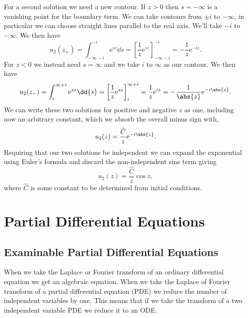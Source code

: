 \documentclass[fleqn]{NotesClass}
\newcommand*{\e}{\mathrm{e}}
\begin{document}
    For a second solution we need a new contour.
    If \(z > 0\) then \(s = -\infty\) is a vanishing point for the boundary term.
    We can take contours from \(\pm i\) to \(-\infty\), in particular we can choose straight lines parallel to the real axis.
    We'll take \(-i\) to \(-\infty\).
    We then have
    \begin{equation}
        u_2(z_+) = \int_{-\infty - i}^{-i} \e^{sz} \dd{s} = \left[ \frac{1}{z}\e^{sz} \right]_{-\infty - i}^{-i} = -\frac{1}{z}\e^{-iz}.
    \end{equation}
    For \(z < 0\) we instead need \(s = \infty\) and we take \(i\) to \(\infty\) as our contour.
    We then have
    \begin{equation}
        u_2(z_-) = \int_{i}^{\infty + i} \e^{sz} \dd{s} = \left[ \frac{1}{z}\e^{sz} \right]_{i}^{\infty + i} = \frac{1}{z}\e^{iz} = -\frac{1}{\abs{z}}\e^{-i\abs{z}}.
    \end{equation}
    We can write these two solutions for positive and negative \(z\) as one, including now an arbitrary constant, which we absorb the overall minus sign with,
    \begin{equation}
        u_2(z) = \frac{\tilde{C}}{z}\e^{-i\abs{z}}.
    \end{equation}
    Requiring that our two solutions be independent we can expand the exponential using Euler's formula and discard the non-independent sine term giving
    \begin{equation}
        u_2(z) = \frac{\hat{C}}{z}\cos z,
    \end{equation}
    where \(\hat{C}\) is some constant to be determined from initial conditions.
    
    \part{Partial Differential Equations}
    \chapter{Examinable Partial Differential Equations}
    When we take the Laplace or Fourier transform of an ordinary differential equation we get an algebraic equation.
    When we take the Laplace of Fourier transform of a partial differential equation (PDE) we reduce the number of independent variables by one.
    This means that if we take the transform of a two independent variable PDE we reduce it to an ODE.
    
\end{document}
